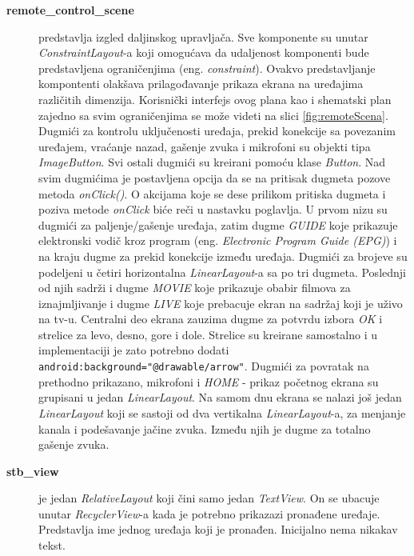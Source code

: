 \documentclass[implementacija.tex]{subfiles}
\begin{document}
\begin{description}
\item[\textbf{remote\_control\_scene}] predstavlja izgled daljinskog upravljača. Sve komponente su unutar \textit{ConstraintLayout}-a koji omogućava da udaljenost komponenti bude predstavljena ograničenjima (eng. \textit{constraint}). Ovakvo predstavljanje kompontenti olakšava prilagođavanje prikaza ekrana na uređajima različitih dimenzija. Korisnički interfejs ovog plana kao i shematski plan zajedno sa svim ograničenjima se može videti na slici \ref{fig:remoteScena}. Dugmići za kontrolu uključenosti uređaja, prekid konekcije sa povezanim uređajem, vraćanje nazad, gašenje zvuka i mikrofoni su objekti tipa \textit{ImageButton}. Svi ostali dugmići su kreirani pomoću klase \textit{Button}. Nad svim dugmićima je postavljena opcija da se na pritisak dugmeta pozove metoda \textit{onClick()}. O akcijama koje se dese prilikom pritiska dugmeta i poziva metode \textit{onClick} biće reči u nastavku poglavlja. U prvom nizu su dugmići za paljenje/gašenje uređaja, zatim dugme \textit{GUIDE} koje prikazuje elektronski vodič kroz program (eng. \textit{Electronic Program Guide (EPG)}) i na kraju dugme za prekid konekcije između uređaja. Dugmići za brojeve su podeljeni u četiri horizontalna \textit{LinearLayout}-a sa po tri dugmeta. Poslednji od njih sadrži i dugme \textit{MOVIE} koje prikazuje obabir filmova za iznajmljivanje i dugme \textit{LIVE} koje prebacuje ekran na sadržaj koji je uživo na tv-u. Centralni deo ekrana zauzima dugme za potvrdu izbora \textit{OK} i strelice za levo, desno, gore i dole. Strelice su kreirane samostalno i u implementaciji je zato potrebno dodati  \verb|android:background="@drawable/arrow"|. Dugmići za povratak na prethodno prikazano, mikrofoni i \textit{HOME} - prikaz početnog ekrana su grupisani u jedan \textit{LinearLayout}. Na samom dnu ekrana se nalazi još jedan \textit{LinearLayout} koji se sastoji od dva vertikalna \textit{LinearLayout}-a, za menjanje kanala i podešavanje jačine zvuka. Između njih je dugme za totalno gašenje zvuka.

\item[\textbf{stb\_view}] je jedan \textit{RelativeLayout} koji čini samo jedan \textit{TextView}. On se ubacuje unutar \textit{RecyclerView}-a kada je potrebno prikazazi pronađene uređaje. Predstavlja ime jednog uređaja koji je pronađen. Inicijalno nema nikakav tekst.
\end{description}
\end{document}
